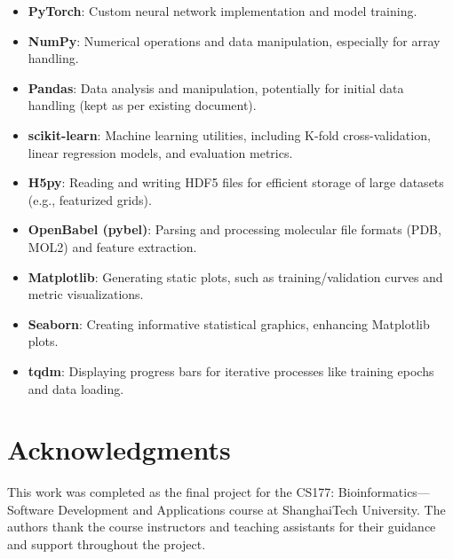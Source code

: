 \documentclass[unnumsec,webpdf,contemporary,large]{oup-authoring-template}
\theoremstyle{thmstyleone}%
\theoremstyle{thmstyletwo}%
\theoremstyle{thmstylethree}%
\begin{document}
\begin{itemize}
    \item \textbf{PyTorch}: Custom neural network implementation and model training.
    \item \textbf{NumPy}: Numerical operations and data manipulation, especially for array handling.
    \item \textbf{Pandas}: Data analysis and manipulation, potentially for initial data handling (kept as per existing document).
    \item \textbf{scikit-learn}: Machine learning utilities, including K-fold cross-validation, linear regression models, and evaluation metrics.
    \item \textbf{H5py}: Reading and writing HDF5 files for efficient storage of large datasets (e.g., featurized grids).
    \item \textbf{OpenBabel (pybel)}: Parsing and processing molecular file formats (PDB, MOL2) and feature extraction.
    \item \textbf{Matplotlib}: Generating static plots, such as training/validation curves and metric visualizations.
    \item \textbf{Seaborn}: Creating informative statistical graphics, enhancing Matplotlib plots.
    \item \textbf{tqdm}: Displaying progress bars for iterative processes like training epochs and data loading.
\end{itemize}

\section{Acknowledgments}
This work was completed as the final project for the CS177: Bioinformatics—Software Development 
and Applications course at ShanghaiTech University. 
The authors thank the course instructors and teaching assistants 
for their guidance and support throughout the project.




\end{document}
